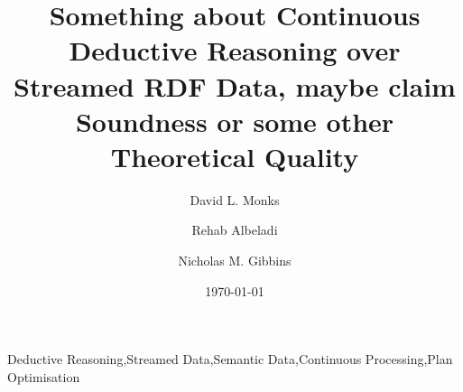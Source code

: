 \begin{frontmatter}
	\title{Something about Continuous Deductive Reasoning over Streamed RDF Data, maybe claim Soundness or some other Theoretical Quality}

	\author{David L. Monks}
	\author{Rehab Albeladi}
	\author{Nicholas M. Gibbins}
	\address{
	          Department of Electronics and Computer Science,\\
	          Faculty of Physical Sciences and Engineering,\\
	          University of Southampton,\\
	          University Rd., Southampton, SO17 1BJ,\\
	          United Kingdom
	}

	\begin{abstract}
		
	\end{abstract}

	\begin{keyword}
	      Deductive Reasoning\sep Streamed Data\sep Semantic Data\sep Continuous Processing\sep Plan Optimisation
	\end{keyword}

	\date{\today}

\end{frontmatter}